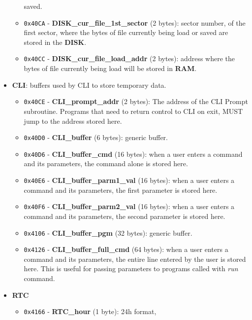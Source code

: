 \documentclass[a4paper,11pt]{article}
\begin{document}
\begin{itemize}
\begin{itemize}
            saved.
            \item \texttt{0x40CA} - \textbf{DISK\_cur\_file\_1st\_sector} (2
            bytes): sector number, of the first sector, where the bytes of file
            currently being load or saved are stored in the \textbf{DISK}.
            \item \texttt{0x40CC} - \textbf{DISK\_cur\_file\_load\_addr} (2
            bytes): address where the bytes of file currently being load will be
            stored in \textbf{RAM}.
        \end{itemize}
        \item \textbf{CLI}: buffers used by CLI to store temporary data.
        \begin{itemize}
            \item \texttt{0x40CE} - \textbf{CLI\_prompt\_addr} (2 bytes): The
            address of the CLI Prompt subroutine. Programs that need to return
            control to CLI on exit, MUST jump to the address stored here.
            \item \texttt{0x40D0} - \textbf{CLI\_buffer} (6 bytes): generic
            buffer.
            \item \texttt{0x40D6} - \textbf{CLI\_buffer\_cmd} (16 bytes): when a
            user enters a command and its parameters, the command alone is
            stored here.
            \item \texttt{0x40E6} - \textbf{CLI\_buffer\_parm1\_val} (16 bytes):
            when a user enters a command and its parameters, the first parameter
            is stored here.
            \item \texttt{0x40F6} - \textbf{CLI\_buffer\_parm2\_val} (16 bytes):
            when a user enters a command and its parameters, the second parameter
            is stored here.
            \item \texttt{0x4106} - \textbf{CLI\_buffer\_pgm} (32 bytes): generic
            buffer.
            \item \texttt{0x4126} - \textbf{CLI\_buffer\_full\_cmd} (64 bytes):
            when a user enters a command and its parameters, the entire line
            entered by the user is stored here. This is useful for passing
            parameters to programs called with \textit{run} command.
        \end{itemize}
        \item \textbf{RTC}
        \begin{itemize}
            \item \texttt{0x4166} - \textbf{RTC\_hour} (1 byte): 24h format,

\end{itemize}
\end{itemize}
\end{document}
